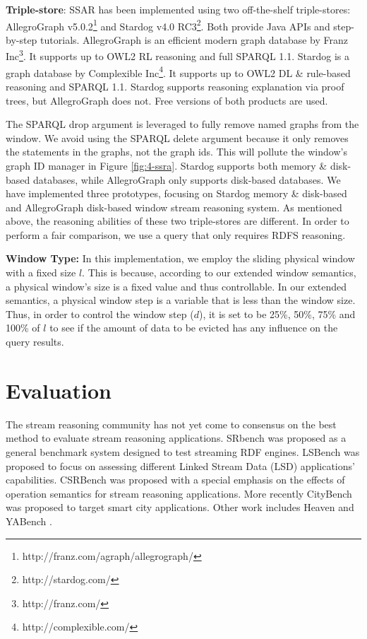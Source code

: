 \textbf{Triple-store}:
SSAR has been implemented using two off-the-shelf triple-stores: AllegroGraph v5.0.2\footnote{http://franz.com/agraph/allegrograph/} and Stardog v4.0 RC3\footnote{http://stardog.com/}. 
Both provide Java APIs and step-by-step tutorials. 
AllegroGraph is an efficient modern graph database by Franz Inc\footnote{http://franz.com/}. 
It supports up to OWL2 RL reasoning and full SPARQL 1.1. 
Stardog is a graph database by Complexible Inc\footnote{http://complexible.com/}. 
It supports up to OWL2 DL \& rule-based reasoning and SPARQL 1.1.
Stardog supports reasoning explanation via proof trees, but AllegroGraph does not. 
Free versions of both products are used.

The SPARQL drop argument is leveraged to fully remove named graphs from the window. 
We avoid using the SPARQL delete argument because it only removes the statements in the graphs, not the graph ids.
This will pollute the window's graph ID manager in Figure \ref{fig:4-ssra}.
Stardog supports both memory \& disk-based databases, while AllegroGraph only supports disk-based databases. 
We have implemented three prototypes, focusing on Stardog memory \& disk-based and AllegroGraph disk-based window stream reasoning system. 
As mentioned above, the reasoning abilities of these two triple-stores are different.
In order to perform a fair comparison, we use a query that only requires RDFS reasoning.
%

\textbf{Window Type:}
In this implementation, we employ the sliding physical window with a fixed size $l$.
This is because, according to our extended window semantics, a physical window's size is a fixed value and thus controllable. 
In our extended semantics, a physical window step is a variable that is less than the window size. 
Thus, in order to control the window step ($d$), it is set to be 25\%, 50\%, 75\% and 100\% of $l$ to see if the amount of data to be evicted has any influence on the query results.
%
\section{Evaluation}
The stream reasoning community has not yet come to consensus on the best method to evaluate stream reasoning applications. 
SRbench\cite{zhang2012srbench} was proposed as a general benchmark system designed to test streaming RDF engines. 
LSBench\cite{le2012linked} was proposed to focus on assessing different Linked Stream Data (LSD) applications' capabilities. 
CSRBench\cite{dell2013correctness} was proposed with a special emphasis on the effects of operation semantics for stream reasoning applications. 
More recently CityBench\cite{ali2015citybench} was proposed to target smart city applications. 
Other work includes Heaven \cite{tommasini2015heaven} and YABench \cite{benchmarkdemo}.

